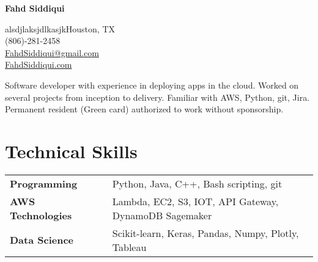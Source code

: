 \documentclass[letter,10pt]{article}
\newcommand{\hskills}[1]{
	\textbf{\bfseries #1} }
\begin{document}
	
		\begin{minipage}[c]{0.7\textwidth}
			\raggedright {\fontsize{45}{60}\selectfont \textbf{Fahd Siddiqui}} \hfill \\ %
		\end{minipage}%
		\begin{minipage}[c]{0.3\textwidth}
			\hfill \raggedleft \normalsize alsdjlaksjdlkasjkHouston, TX \\
			\raggedleft \normalsize (806)-281-2458 \\
			\raggedleft \normalsize \href{mailto:FahdSiddiqui@gmail.com}{FahdSiddiqui@gmail.com} \\
			\raggedleft \normalsize \href{FahdSiddiqui.com}{FahdSiddiqui.com} 
		\end{minipage}   
		
		\vspace{0.25cm} 
		{\color{UI_black} \hrulefill}
	
	\vspace{0.2 cm}
	Software developer with experience in deploying apps in the cloud. Worked on several projects from inception to delivery. Familiar with AWS, Python, git, Jira. Permanent resident (Green card) authorized to work without sponsorship.
	\vspace{-0.2cm}
	
	
	\section{Technical Skills}
	\begin{tabular}{p{11em} p{1em} p{43em}}
		\hskills{Programming} &  & Python, Java, C++, Bash scripting, git  \\
		\hskills{AWS Technologies}&  &  Lambda, EC2, S3, IOT, API Gateway, DynamoDB Sagemaker \\
		\hskills{Data Science} &  & Scikit-learn, Keras, Pandas, Numpy, Plotly, Tableau \\
	\end{tabular}
	\vspace{-0.2cm}
	
\end{document}
